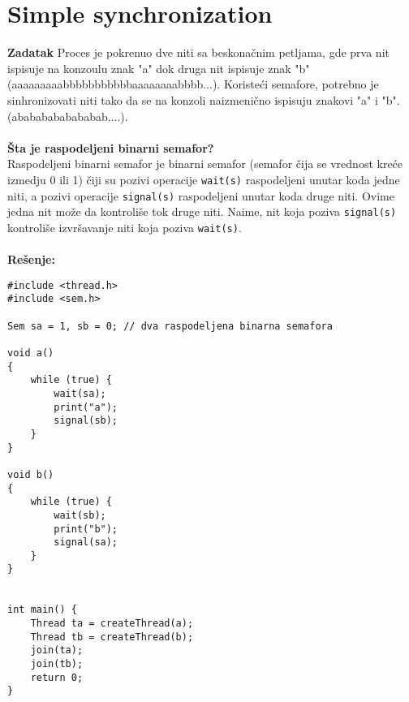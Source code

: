 \clearpage
\section{Simple synchronization}
\textbf{\large Zadatak} Proces je pokrenuo dve niti sa beskona\v{c}nim petljama, gde prva nit ispisuje na konzoulu znak "a" dok druga nit ispisuje znak "b" (aaaaaaaaabbbbbbbbbbbaaaaaaaabbbb...). Koriste\'{c}i semafore, potrebno je sinhronizovati niti tako da se na konzoli naizmeni\v{c}no ispisuju znakovi "a" i "b". (abababababababab....).
\\\\
\textbf{\v{S}ta je raspodeljeni binarni semafor?}\\
Raspodeljeni binarni semafor je binarni semafor (semafor \v{c}ija se vrednost kre\'{c}e izmedju 0 ili 1) \v{c}iji su pozivi operacije \texttt{wait(s)} raspodeljeni unutar koda jedne niti, a pozivi operacije \texttt{signal(s)} raspodeljeni unutar koda druge niti. Ovime jedna nit mo\v{z}e da kontroli\v{s}e tok druge niti. Naime, nit koja poziva \texttt{signal(s)} kontroli\v{s}e izvr\v{s}avanje niti koja poziva \texttt{wait(s)}.
\\\\
\textbf{\large Re\v{s}enje:} 
\begin{lstlisting}
#include <thread.h>
#include <sem.h>

Sem sa = 1, sb = 0; // dva raspodeljena binarna semafora

void a() 
{
    while (true) {
        wait(sa);
        print("a");
		signal(sb);
    }
}

void b() 
{
    while (true) {
        wait(sb);
        print("b");
		signal(sa);
    }
}


int main() {
    Thread ta = createThread(a);
    Thread tb = createThread(b);
    join(ta);
    join(tb);
    return 0;
}

\end{lstlisting}